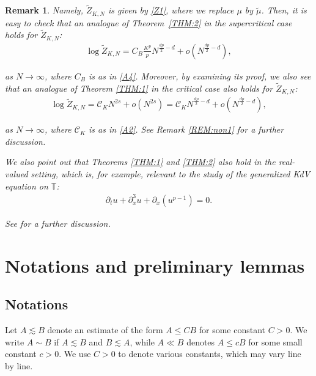 \documentclass[letterpaper, 11pt,  reqno]{amsart}
\newcommand{\Rd}{\color{red}}
\newtheorem{remark}[theorem]{Remark}
\newcommand{\noi}{\noindent}
\newcommand{\T}{\mathbb{T}}
\newcommand{\al}{\alpha}
\newcommand{\wt}{\widetilde}
\newcommand{\dx}{\partial_x}
\newcommand{\dt}{\partial_t}
\newcommand{\les}{\lesssim}
\numberwithin{equation}{section}
\numberwithin{theorem}{section}
\newcommand{\CC}{\mathcal{C}}
\begin{document}
\begin{remark}
\noi
Namely, 
$\wt Z_{K, N}$
is given by 
 \eqref{Z1}, 
where we replace $\mu$  by $\wt \mu$.
Then, it is easy to check that 
an analogue of Theorem~\ref{THM:2} 
in the supercritical case  holds
for $\wt Z_{K, N}$:
\begin{align*}
\log \wt Z_{K, N}= C_B \frac{K^p}{p} N^{\frac{dp}{2}-d}+o(N^{\frac{dp}{2}-d}), 
\end{align*}

\noi
as $N \to \infty$, where $C_B$ is as in \eqref{A4}.
Moreover, by examining its proof, 
we also see that 
an analogue of  Theorem \ref{THM:1}
in the critical case
also holds
for $\wt Z_{K, N}$:
\begin{align}
\log \wt Z_{K, N} 
 = 
\CC_{K} N^{2s}+o(N^{2s})
 = 
\CC_{K} N^{\frac{dp}{2}-d}+o(N^{\frac{dp}{2}-d}),    
\label{ZA2}
\end{align}

\noi
as $N \to \infty$, 
where $\CC_K$ is as in \eqref{A2}.
See Remark \ref{REM:non1} for a further discussion.





We also point out that 
Theorems \ref{THM:1} and \ref{THM:2} also hold in the real-valued setting, 
which  is, for example,  relevant to the study of the generalized KdV equation
on $\T$:
\begin{align*}
\dt u + \dx^3 u + \dx (u^{p-1}) = 0.
\end{align*}

\noi
See 
\cite{ORTh, CK} for a further discussion.


\end{remark}



\section{Notations and preliminary lemmas}

\subsection{Notations}
Let $A\les B$ denote an estimate of the form $A\leq CB$ for some constant $C>0$. We write $A\sim B$ if $A\les B$ and $B\les A$, while $A\ll B$ denotes $A\leq c B$ for some small constant $c> 0$. 
We use $C>0$ to denote various constants, which may vary line by line.
\end{document}
